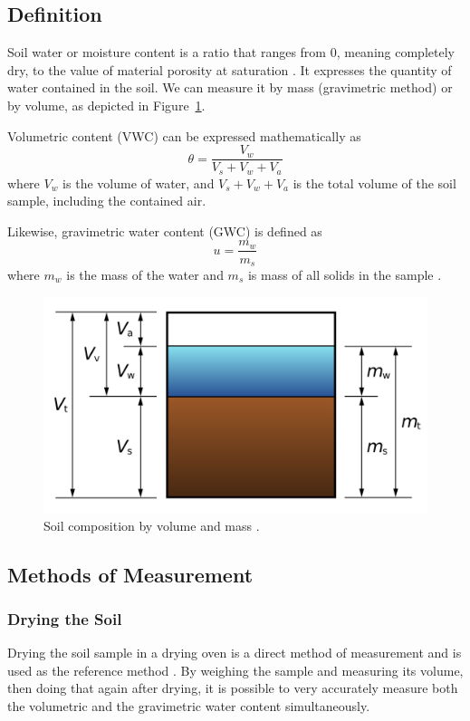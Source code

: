 \subsection{Definition}
Soil water or moisture content is a ratio that ranges from 0, meaning completely dry, to the value of material porosity at saturation \cite{webster_humidity_1998}. It expresses the quantity of water contained in the soil. We can measure it by mass (gravimetric method) or by volume, as depicted in Figure~\ref{fig:soil-phase-diagram}.

Volumetric content (VWC) can be expressed mathematically as
\begin{equation}
    \label{equation:volumetric-content} \theta = \dfrac{V_w}{V_s + V_w + V_a}
\end{equation}
where $V_w$ is the volume of water, and $V_s + V_w + V_a$ is the total volume of the soil sample, including the contained air.

Likewise, gravimetric water content (GWC) is defined as
\begin{equation}
    \label{equation:gravimetric-content} u = \dfrac{m_w}{m_s}
\end{equation}
where $m_w$ is the mass of the water and $m_s$ is mass of all solids in the sample \cite{edaphic_scientific_pty_ltd_how_2024}.

\begin{figure}
    \includegraphics[width=.5\textwidth]{fig/soil-phase-diagram.png}
    \caption{\label{fig:soil-phase-diagram} Soil composition by volume and mass \cite{noauthor_water_2023}.}
\end{figure}

\subsection{Methods of Measurement}
\subsubsection{Drying the Soil}
Drying the soil sample in a drying oven is a direct method of measurement and is used as the reference method \cite{webster_humidity_1998}. By weighing the sample and measuring its volume, then doing that again after drying, it is possible to very accurately measure both the volumetric and the gravimetric water content simultaneously.

